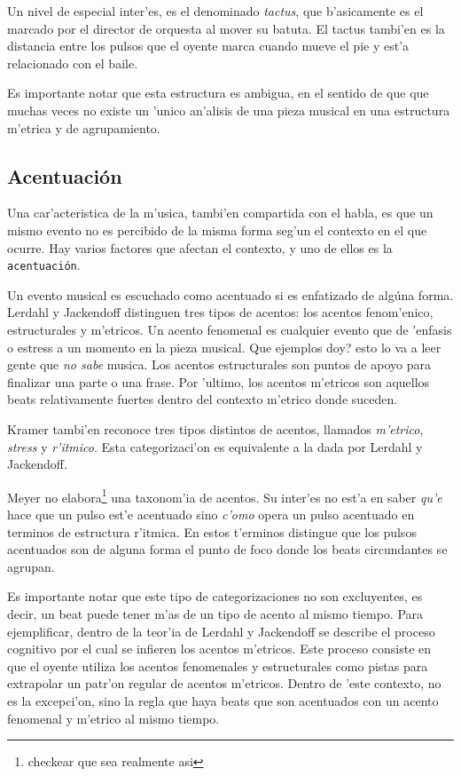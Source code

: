 Un nivel de especial inter'es, es el denominado \emph{tactus}, que b'asicamente es el marcado por el director de orquesta al mover su batuta. 
El tactus tambi'en es la distancia entre los pulsos que el oyente marca cuando mueve el pie y est'a relacionado con el baile. 

Es importante notar que esta estructura es ambigua, en el sentido de que que muchas veces no existe un 'unico an'alisis de una pieza musical 
en una estructura m'etrica y de agrupamiento.


\subsection{Acentuaci\'on}
Una car'acteristica de la m'usica, tambi'en compartida con el habla, es que un mismo evento no es percibido de la misma forma seg'un
el contexto en el que ocurre. Hay varios factores que afectan el contexto, y uno de ellos es la \texttt{acentuaci\'on}. 

Un evento musical es escuchado como acentuado si es enfatizado de alg\'una forma. Lerdahl y Jackendoff\cite{LerdahlJackendoff83} distinguen tres tipos de 
acentos: los acentos fenom'enico, estructurales y m'etricos.
Un acento fenomenal es cualquier evento que de 'enfasis o estress a un momento en la pieza musical. \alert{Que ejemplos doy? esto lo va a 
leer gente que \emph{no sabe} musica}. Los acentos estructurales son puntos de apoyo para finalizar una parte o una frase. 
Por 'ultimo, los acentos m'etricos son aquellos beats relativamente fuertes dentro del contexto m'etrico donde suceden.

Kramer\cite{Kramer88} tambi'en reconoce tres tipos distintos de acentos, llamados \emph{m'etrico}, \emph{stress} y \emph{r'itmico}. Esta categorizaci'on
es equivalente a la dada por Lerdahl y Jackendoff.

Meyer\cite{CooperMeyer60} no elabora\footnote{checkear que sea realmente asi} una taxonom'ia de acentos. Su inter'es no est'a en saber \emph{qu'e} hace
que un pulso est'e acentuado sino \emph{c'omo} opera un pulso acentuado en terminos de estructura r'itmica. En estos t'erminos distingue
que los pulsos acentuados son de alguna forma el punto de foco donde los beats circundantes se agrupan. 

Es importante notar que este tipo de categorizaciones no son excluyentes, es decir, un beat puede tener m'as de un tipo de acento al mismo tiempo.
Para ejemplificar, dentro de la teor'ia de Lerdahl y Jackendoff se describe el proceso cognitivo por el cual se infieren los acentos m'etricos. Este
proceso consiste en que el oyente utiliza los acentos fenomenales y estructurales como pistas para extrapolar un patr'on regular de acentos m'etricos. 
Dentro de 'este contexto, no es la excepci'on, sino la regla que haya beats que son acentuados con un acento fenomenal y m'etrico al mismo tiempo.


